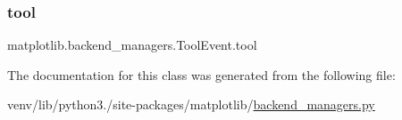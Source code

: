 \subsubsection{\texorpdfstring{tool}{tool}}
{\footnotesize\ttfamily matplotlib.\+backend\+\_\+managers.\+Tool\+Event.\+tool}



The documentation for this class was generated from the following file\+:\begin{DoxyCompactItemize}
\item 
venv/lib/python3./site-\/packages/matplotlib/\hyperlink{backend__managers_8py}{backend\+\_\+managers.\+py}\end{DoxyCompactItemize}
